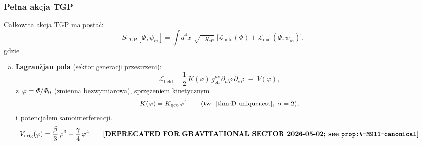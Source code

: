 \subsubsection{Pe\l{}na akcja TGP}\label{sssec:full-action}

\begin{hypothesis}\label{hyp:unified-action}
Ca\l{}kowita akcja TGP ma posta\'c:
\begin{equation}\label{eq:S-TGP-unified}
  \boxed{
    S_{\mathrm{TGP}}[\Phi,\psi_m]
    = \int d^4x\;\sqrt{-g_{\mathrm{eff}}}\;\biggl[
      \mathcal{L}_{\mathrm{field}}(\Phi)
      + \mathcal{L}_{\mathrm{mat}}(\Phi,\psi_m)
    \biggr],
  }
\end{equation}
gdzie:
\begin{enumerate}[(a)]
  \item \textbf{Lagran\.zjan pola} (sektor generacji przestrzeni):
  \begin{equation}\label{eq:L-field}
    \mathcal{L}_{\mathrm{field}}
    = \frac{1}{2}\,K(\varphi)\,
      g_{\mathrm{eff}}^{\mu\nu}\,
      \partial_\mu\varphi\,\partial_\nu\varphi
    \;-\; V(\varphi),
  \end{equation}
  z~$\varphi = \varPhi/\varPhi_0$ (zmienna bezwymiarowa), sprz\k{e}\.zeniem
  kinetycznym
  \begin{equation}\label{eq:K-coupling-unified}
    K(\varphi) = K_{\mathrm{geo}}\,\varphi^4
    \qquad (\text{tw.~\ref{thm:D-uniqueness}},\;\alpha = 2),
  \end{equation}
  i~potencja\l{}em samointerferencji.
  \begin{equation}\label{eq:V-selfinterference}
    V_{\rm orig}(\varphi) = \frac{\beta}{3}\,\varphi^3 - \frac{\gamma}{4}\,\varphi^4
    \qquad \textbf{[DEPRECATED FOR GRAVITATIONAL SECTOR 2026-05-02; see \texttt{prop:V-M911-canonical}]}

\end{equation}
\end{enumerate}
\end{hypothesis}
